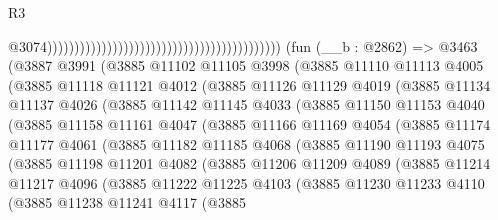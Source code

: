 \begin{lexlean}{R3}
\begin{coremodule}
                                                                                          @3074)))))))))))))))))))))))))))))))))))))))))))
    (fun (__b : @2862) =>
    @3463
      (@3887
        @3991
        (@3885
          @11102
          @11105
          @3998
          (@3885
            @11110
            @11113
            @4005
            (@3885
              @11118
              @11121
              @4012
              (@3885
                @11126
                @11129
                @4019
                (@3885
                  @11134
                  @11137
                  @4026
                  (@3885
                    @11142
                    @11145
                    @4033
                    (@3885
                      @11150
                      @11153
                      @4040
                      (@3885
                        @11158
                        @11161
                        @4047
                        (@3885
                          @11166
                          @11169
                          @4054
                          (@3885
                            @11174
                            @11177
                            @4061
                            (@3885
                              @11182
                              @11185
                              @4068
                              (@3885
                                @11190
                                @11193
                                @4075
                                (@3885
                                  @11198
                                  @11201
                                  @4082
                                  (@3885
                                    @11206
                                    @11209
                                    @4089
                                    (@3885
                                      @11214
                                      @11217
                                      @4096
                                      (@3885
                                        @11222
                                        @11225
                                        @4103
                                        (@3885
                                          @11230
                                          @11233
                                          @4110
                                          (@3885
                                            @11238
                                            @11241
                                            @4117
                                            (@3885

\end{coremodule}
\end{lexlean}
